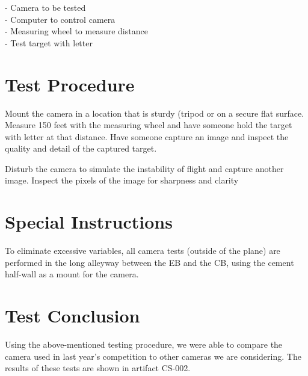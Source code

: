 \documentclass[]{auvsi_doc}
\begin{document}
- Camera to be tested\\
- Computer to control camera\\
- Measuring wheel to measure distance\\
- Test target with letter

\section{Test Procedure}
Mount the camera in a location that is sturdy (tripod or on a secure flat surface. Measure 150 feet with the measuring wheel and have someone hold the target with letter at that distance. Have someone capture an image and inspect the quality and detail of the captured target.

Disturb the camera to simulate the instability of flight and capture another image. Inspect the pixels of the image for sharpness and clarity

\section{Special Instructions}

To eliminate excessive variables, all camera tests (outside of the plane) are performed in the long alleyway between the EB and the CB, using the cement half-wall as a mount for the camera.

\section{Test Conclusion}

Using the above-mentioned testing procedure, we were able to compare the camera used in last year's competition to other cameras we are considering. The results of these tests are shown in artifact CS-002.
\end{document}
